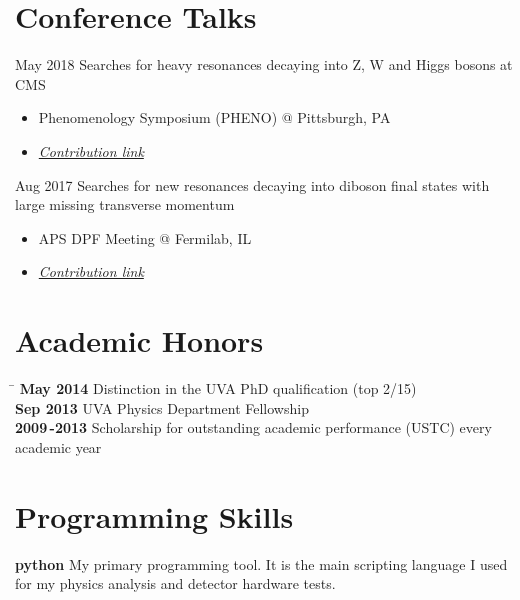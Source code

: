 \documentclass[14pt]{article} %
\begin{document}
\section{Conference Talks}
\job
{May 2018}{}
{Searches for heavy resonances decaying into Z, W and Higgs bosons at CMS}
{\begin{itemize}
\item Phenomenology Symposium (PHENO) @ Pittsburgh, PA
\item \href{https://indico.cern.ch/event/699148/contributions/2986197/}{\textit{Contribution link}}
\end{itemize}
}
\job
{Aug 2017}{}
{Searches for new resonances decaying into diboson final states with large missing transverse momentum}
{\begin{itemize}
\item APS DPF Meeting @ Fermilab, IL
\item \href{https://indico.fnal.gov/event/11999/session/10/contribution/56}{\textit{Contribution link}}
\end{itemize}
}

\section{Academic Honors}
\begin{tabbing} %
\hspace{2cm} \= \kill
\textbf{May 2014} \> Distinction in the UVA PhD qualification (top 2/15) \\
\textbf{Sep 2013} \> UVA Physics Department Fellowship \\
\textbf{2009\,-2013} \> Scholarship for outstanding academic performance (USTC) every academic year\\
\end{tabbing}

\section{Programming Skills}
\textbf{python}
\small{
My primary programming tool. It is the main scripting language I used for my physics analysis and detector hardware tests.
}\\
\end{document}
